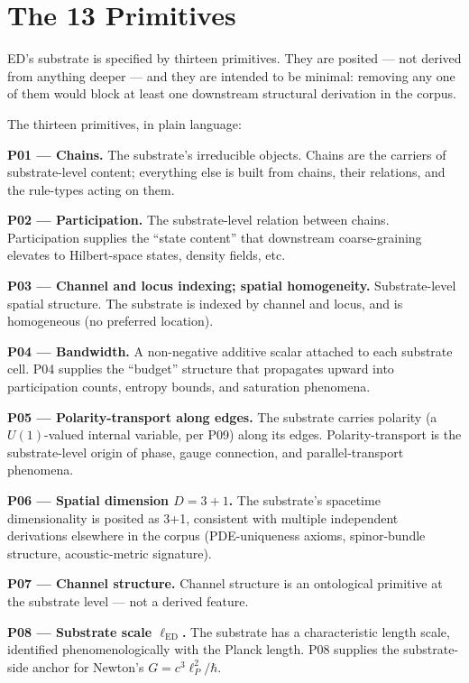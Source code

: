 \documentclass[11pt,a4paper]{article}
\begin{document}
\section{The 13 Primitives}

ED's substrate is specified by thirteen primitives. They are posited --- not derived from anything deeper --- and they are intended to be minimal: removing any one of them would block at least one downstream structural derivation in the corpus.

The thirteen primitives, in plain language:

\textbf{P01 --- Chains.} The substrate's irreducible objects. Chains are the carriers of substrate-level content; everything else is built from chains, their relations, and the rule-types acting on them.

\textbf{P02 --- Participation.} The substrate-level relation between chains. Participation supplies the ``state content'' that downstream coarse-graining elevates to Hilbert-space states, density fields, etc.

\textbf{P03 --- Channel and locus indexing; spatial homogeneity.} Substrate-level spatial structure. The substrate is indexed by channel and locus, and is homogeneous (no preferred location).

\textbf{P04 --- Bandwidth.} A non-negative additive scalar attached to each substrate cell. P04 supplies the ``budget'' structure that propagates upward into participation counts, entropy bounds, and saturation phenomena.

\textbf{P05 --- Polarity-transport along edges.} The substrate carries polarity (a $U(1)$-valued internal variable, per P09) along its edges. Polarity-transport is the substrate-level origin of phase, gauge connection, and parallel-transport phenomena.

\textbf{P06 --- Spatial dimension $D = 3+1$.} The substrate's spacetime dimensionality is posited as 3+1, consistent with multiple independent derivations elsewhere in the corpus (PDE-uniqueness axioms, spinor-bundle structure, acoustic-metric signature).

\textbf{P07 --- Channel structure.} Channel structure is an ontological primitive at the substrate level --- not a derived feature.

\textbf{P08 --- Substrate scale $\ell_\mathrm{ED}$.} The substrate has a characteristic length scale, identified phenomenologically with the Planck length. P08 supplies the substrate-side anchor for Newton's $G = c^3 \ell_P^2 / \hbar$.
\end{document}

